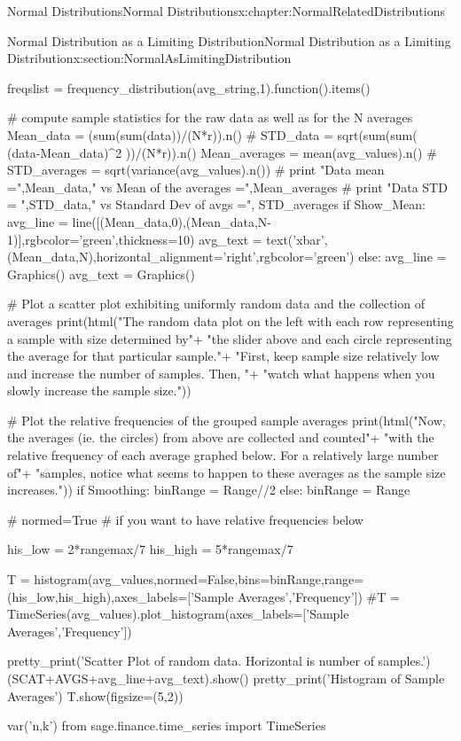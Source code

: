 \documentclass[oneside,10pt,]{book}
\numberwithin{equation}{section}
\begin{document}
\begin{chapterptx}{Normal Distributions}{}{Normal Distributions}{}{}{x:chapter:NormalRelatedDistributions}
\begin{sectionptx}{Normal Distribution as a Limiting Distribution}{}{Normal Distribution as a Limiting Distribution}{}{}{x:section:NormalAsLimitingDistribution}
\begin{sageinput}
    freqslist = frequency_distribution(avg_string,1).function().items()
       
       
# compute sample statistics for the raw data as well as for the N averages
    Mean_data = (sum(sum(data))/(N*r)).n()
#    STD_data = sqrt(sum(sum( (data-Mean_data)^2 ))/(N*r)).n()
    Mean_averages = mean(avg_values).n()
#    STD_averages = sqrt(variance(avg_values).n())
#    print "Data mean =",Mean_data," vs Mean of the averages =",Mean_averages
#    print "Data STD = ",STD_data," vs Standard Dev of avgs =", STD_averages
    if Show_Mean:
        avg_line = line([(Mean_data,0),(Mean_data,N-1)],rgbcolor='green',thickness=10)
        avg_text = text('xbar',(Mean_data,N),horizontal_alignment='right',rgbcolor='green')
    else:
        avg_line = Graphics()
        avg_text = Graphics()
            
#  Plot a scatter plot exhibiting uniformly random data and the collection of averages 
    print(html("The random data plot on the left with each row representing a sample with size determined by\n"+
         "the slider above and each circle representing the average for that particular sample.\n"+
         "First, keep sample size relatively low and increase the number of samples.  Then, \n"+
         "watch what happens when you slowly increase the sample size."))

    
#  Plot the relative frequencies of the grouped sample averages
    print(html("Now, the averages (ie. the circles) from above are collected and counted\n"+
         "with the relative frequency of each average graphed below.  For a relatively large number of\n"+
         "samples, notice what seems to happen to these averages as the sample size increases."))
    if Smoothing:
        binRange = Range//2
    else:
        binRange = Range
    
    # normed=True  # if you want to have relative frequencies below
    
    his_low = 2*rangemax/7
    his_high = 5*rangemax/7
    
    T = histogram(avg_values,normed=False,bins=binRange,range=(his_low,his_high),axes_labels=['Sample Averages','Frequency']) 
    #T = TimeSeries(avg_values).plot_histogram(axes_labels=['Sample Averages','Frequency'])   
    
    pretty_print('Scatter Plot of random data.  Horizontal is number of samples.')
    (SCAT+AVGS+avg_line+avg_text).show()
    pretty_print('Histogram of Sample Averages')
    T.show(figsize=(5,2))
\end{sageinput}
%
\par
\leavevmode%
\begin{sageinput}
var('n,k')
from sage.finance.time_series import TimeSeries


\end{sageinput}
\end{sectionptx}
\end{chapterptx}
\end{document}
